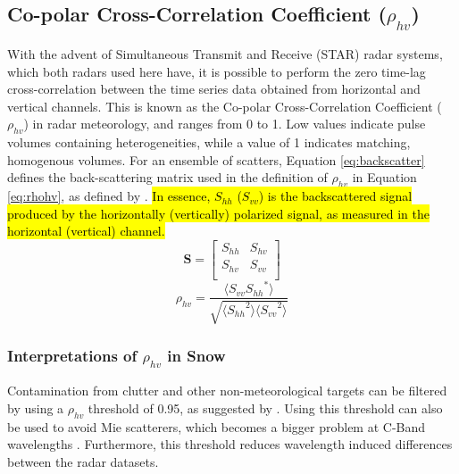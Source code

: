 \subsection{Co-polar Cross-Correlation Coefficient ($\rho_{hv}$)}
With the advent of Simultaneous Transmit and Receive (STAR) radar systems, which both radars used here have, it is possible to perform the zero time-lag
cross-correlation between the time series data obtained from horizontal and vertical channels. This is known as the Co-polar Cross-Correlation Coefficient
($\rho_{hv}$) in radar meteorology, and ranges from 0 to 1. Low values indicate pulse volumes containing heterogeneities, while a value of 1 indicates
matching, homogenous volumes. For an ensemble of scatters, Equation \ref{eq:backscatter} defines the back-scattering matrix used in the definition of
$\rho_{hv}$ in Equation \ref{eq:rhohv}, as defined by \citet{Ryzhkov2007b}. \hl{In essence, $S_{hh}$ ($S_{vv}$) is the backscattered signal produced by the horizontally (vertically) polarized signal, as measured in the horizontal (vertical) channel.}
\begin{equation}\label{eq:backscatter}
\mathbf{S} = \begin{bmatrix}
             S_{hh}       & S_{hv} \\
             S_{hv}       & S_{vv} \\
             \end{bmatrix}
\end{equation}
\begin{equation}\label{eq:rhohv}
\rho_{hv} = \frac{\langle{S_{vv}{S_{hh}}^{*}\rangle}}{\sqrt{\langle{{S_{hh}}^{2}\rangle}\langle{{S_{vv}}^{2}\rangle}}}
\end{equation}
\subsubsection{Interpretations of $\rho_{hv}$ in Snow}
Contamination from clutter and other non-meteorological targets can be filtered by using a $\rho_{hv}$ threshold of 0.95, as suggested by \citet{Straka2000}.
Using this threshold can also be used to avoid Mie scatterers, which becomes a bigger problem at C-Band wavelengths \citet{Fabry2015}. Furthermore, this threshold reduces wavelength induced differences between the radar datasets.
 



